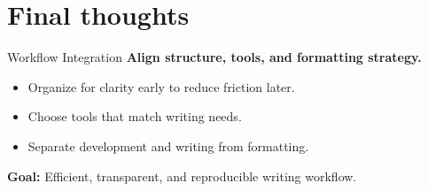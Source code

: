 \documentclass{beamer}
\begin{document}
\section{Final thoughts}
\begin{frame}{Workflow Integration}
\textbf{Align structure, tools, and formatting strategy.}

\begin{itemize}
    \item Organize for clarity early to reduce friction later.
    \item Choose tools that match writing needs.
    \item Separate development and writing from formatting.
\end{itemize}

\begin{block}{\textbf{Goal:}}
    Efficient, transparent, and reproducible writing workflow.
\end{block}
\end{frame}

\end{document}
